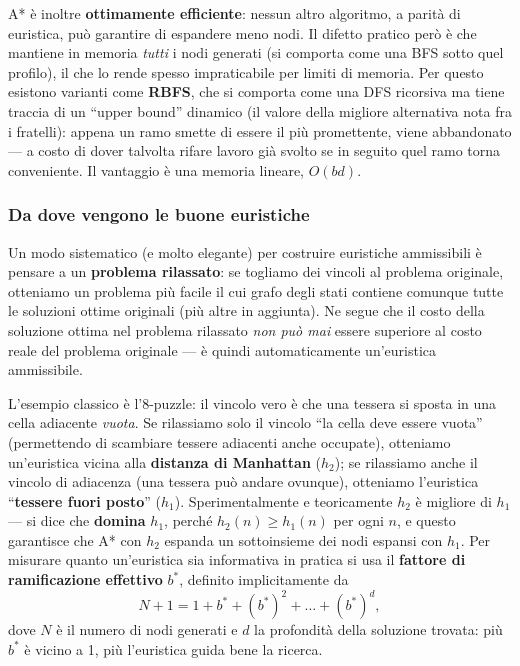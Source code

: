 \documentclass[11pt,a4paper]{article}
\begin{document}
A* è inoltre \textbf{ottimamente efficiente}: nessun altro algoritmo, a parità di euristica, può garantire di espandere meno nodi. Il difetto pratico però è che mantiene in memoria \emph{tutti} i nodi generati (si comporta come una BFS sotto quel profilo), il che lo rende spesso impraticabile per limiti di memoria. Per questo esistono varianti come \textbf{RBFS}, che si comporta come una DFS ricorsiva ma tiene traccia di un ``upper bound'' dinamico (il valore della migliore alternativa nota fra i fratelli): appena un ramo smette di essere il più promettente, viene abbandonato --- a costo di dover talvolta rifare lavoro già svolto se in seguito quel ramo torna conveniente. Il vantaggio è una memoria lineare, $O(bd)$.

\subsubsection{Da dove vengono le buone euristiche}

Un modo sistematico (e molto elegante) per costruire euristiche ammissibili è pensare a un \textbf{problema rilassato}: se togliamo dei vincoli al problema originale, otteniamo un problema più facile il cui grafo degli stati contiene comunque tutte le soluzioni ottime originali (più altre in aggiunta). Ne segue che il costo della soluzione ottima nel problema rilassato \emph{non può mai} essere superiore al costo reale del problema originale --- è quindi automaticamente un'euristica ammissibile.

L'esempio classico è l'8-puzzle: il vincolo vero è che una tessera si sposta in una cella adiacente \emph{vuota}. Se rilassiamo solo il vincolo ``la cella deve essere vuota'' (permettendo di scambiare tessere adiacenti anche occupate), otteniamo un'euristica vicina alla \textbf{distanza di Manhattan} ($h_2$); se rilassiamo anche il vincolo di adiacenza (una tessera può andare ovunque), otteniamo l'euristica ``\textbf{tessere fuori posto}'' ($h_1$). Sperimentalmente e teoricamente $h_2$ è migliore di $h_1$ --- si dice che \textbf{domina} $h_1$, perché $h_2(n) \ge h_1(n)$ per ogni $n$, e questo garantisce che A* con $h_2$ espanda un sottoinsieme dei nodi espansi con $h_1$. Per misurare quanto un'euristica sia informativa in pratica si usa il \textbf{fattore di ramificazione effettivo} $b^*$, definito implicitamente da
\[
N + 1 = 1 + b^* + (b^*)^2 + \dots + (b^*)^d,
\]
dove $N$ è il numero di nodi generati e $d$ la profondità della soluzione trovata: più $b^*$ è vicino a 1, più l'euristica guida bene la ricerca.
\end{document}
